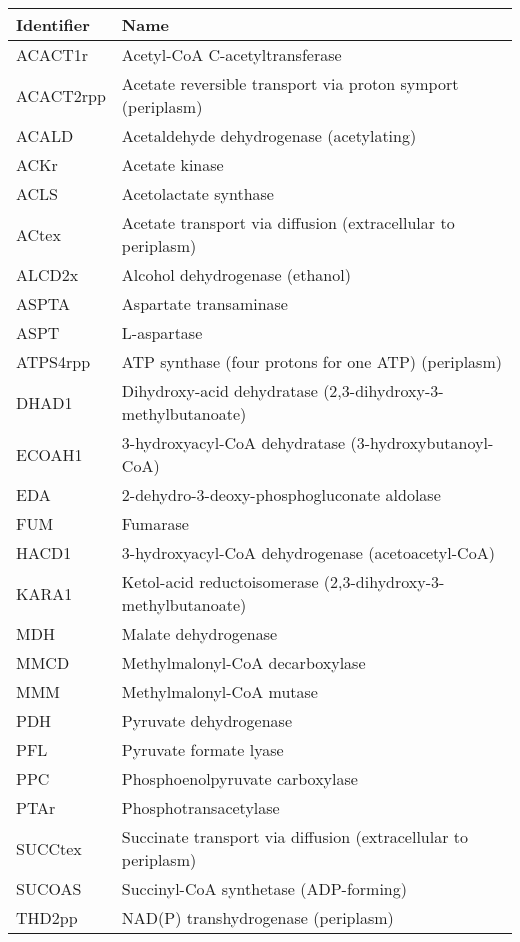 \begin{tabular}{ll}
\toprule
Identifier & Name  \\
\midrule
ACACT1r	&	Acetyl-CoA C-acetyltransferase	\\
ACACT2rpp	&		Acetate reversible transport via proton symport (periplasm) \\
ACALD	&	Acetaldehyde dehydrogenase (acetylating)	\\
ACKr	&	Acetate kinase	\\
ACLS	&	Acetolactate synthase	\\
ACtex	&	Acetate transport via diffusion (extracellular to periplasm)	\\
ALCD2x	&	Alcohol dehydrogenase (ethanol)	\\
ASPTA	&	Aspartate transaminase	\\
ASPT	&	L-aspartase	\\
ATPS4rpp	&	ATP synthase (four protons for one ATP) (periplasm)	\\
DHAD1	&	Dihydroxy-acid dehydratase (2,3-dihydroxy-3-methylbutanoate)	\\
ECOAH1	&	3-hydroxyacyl-CoA dehydratase (3-hydroxybutanoyl-CoA)	\\
EDA	&	2-dehydro-3-deoxy-phosphogluconate aldolase	\\
FUM	&	Fumarase	\\
HACD1	&	3-hydroxyacyl-CoA dehydrogenase (acetoacetyl-CoA)	\\
KARA1	&	Ketol-acid reductoisomerase (2,3-dihydroxy-3-methylbutanoate)	\\
MDH	&	Malate dehydrogenase	\\
MMCD	&	Methylmalonyl-CoA decarboxylase	\\
MMM	&	Methylmalonyl-CoA mutase	\\
PDH	&	Pyruvate dehydrogenase	\\
PFL	&	Pyruvate formate lyase	\\
PPC	&	Phosphoenolpyruvate carboxylase	\\
PTAr	&	Phosphotransacetylase	\\
SUCCtex	&	Succinate transport via diffusion (extracellular to periplasm)	\\
SUCOAS	&	Succinyl-CoA synthetase (ADP-forming)	\\
THD2pp	&	NAD(P) transhydrogenase (periplasm)	\\
\hline
\end{tabular}
